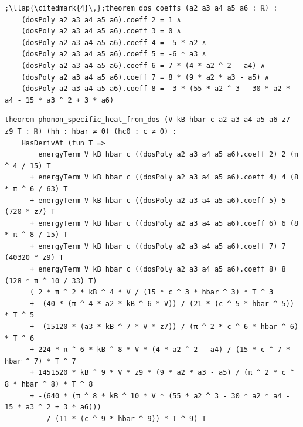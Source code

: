 \begin{lstlisting}[style=leancat]
;\llap{\citedmark{4}\,};theorem dos_coeffs (a2 a3 a4 a5 a6 : ℝ) :
    (dosPoly a2 a3 a4 a5 a6).coeff 2 = 1 ∧
    (dosPoly a2 a3 a4 a5 a6).coeff 3 = 0 ∧
    (dosPoly a2 a3 a4 a5 a6).coeff 4 = -5 * a2 ∧
    (dosPoly a2 a3 a4 a5 a6).coeff 5 = -6 * a3 ∧
    (dosPoly a2 a3 a4 a5 a6).coeff 6 = 7 * (4 * a2 ^ 2 - a4) ∧
    (dosPoly a2 a3 a4 a5 a6).coeff 7 = 8 * (9 * a2 * a3 - a5) ∧
    (dosPoly a2 a3 a4 a5 a6).coeff 8 = -3 * (55 * a2 ^ 3 - 30 * a2 * a4 - 15 * a3 ^ 2 + 3 * a6)
\end{lstlisting}

\begin{lstlisting}[style=leancat]
theorem phonon_specific_heat_from_dos (V kB hbar c a2 a3 a4 a5 a6 z7 z9 T : ℝ) (hh : hbar ≠ 0) (hc0 : c ≠ 0) :
    HasDerivAt (fun T =>
        energyTerm V kB hbar c ((dosPoly a2 a3 a4 a5 a6).coeff 2) 2 (π ^ 4 / 15) T
      + energyTerm V kB hbar c ((dosPoly a2 a3 a4 a5 a6).coeff 4) 4 (8 * π ^ 6 / 63) T
      + energyTerm V kB hbar c ((dosPoly a2 a3 a4 a5 a6).coeff 5) 5 (720 * z7) T
      + energyTerm V kB hbar c ((dosPoly a2 a3 a4 a5 a6).coeff 6) 6 (8 * π ^ 8 / 15) T
      + energyTerm V kB hbar c ((dosPoly a2 a3 a4 a5 a6).coeff 7) 7 (40320 * z9) T
      + energyTerm V kB hbar c ((dosPoly a2 a3 a4 a5 a6).coeff 8) 8 (128 * π ^ 10 / 33) T)
      ( 2 * π ^ 2 * kB ^ 4 * V / (15 * c ^ 3 * hbar ^ 3) * T ^ 3
      + -(40 * (π ^ 4 * a2 * kB ^ 6 * V)) / (21 * (c ^ 5 * hbar ^ 5)) * T ^ 5
      + -(15120 * (a3 * kB ^ 7 * V * z7)) / (π ^ 2 * c ^ 6 * hbar ^ 6) * T ^ 6
      + 224 * π ^ 6 * kB ^ 8 * V * (4 * a2 ^ 2 - a4) / (15 * c ^ 7 * hbar ^ 7) * T ^ 7
      + 1451520 * kB ^ 9 * V * z9 * (9 * a2 * a3 - a5) / (π ^ 2 * c ^ 8 * hbar ^ 8) * T ^ 8
      + -(640 * (π ^ 8 * kB ^ 10 * V * (55 * a2 ^ 3 - 30 * a2 * a4 - 15 * a3 ^ 2 + 3 * a6)))
          / (11 * (c ^ 9 * hbar ^ 9)) * T ^ 9) T
\end{lstlisting}

